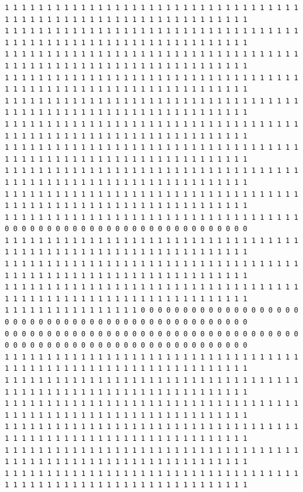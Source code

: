 \documentclass [10 pt, a4 paper]{report}
\begin{document}
\begin{lstlisting}[caption=Output of the simulation once it is finished, label={lst:code1}, frame=single]
1 1 1 1 1 1 1 1 1 1 1 1 1 1 1 1 1 1 1 1 1 1 1 1 1 1 1 1 1 1 1 1 1 1 1 1 1 1 1 1 1 1 1 1 1 1 1 1 1 1 1 1 1 1 1 1 1 1 1 1 1 1 1 1
1 1 1 1 1 1 1 1 1 1 1 1 1 1 1 1 1 1 1 1 1 1 1 1 1 1 1 1 1 1 1 1 1 1 1 1 1 1 1 1 1 1 1 1 1 1 1 1 1 1 1 1 1 1 1 1 1 1 1 1 1 1 1 1
1 1 1 1 1 1 1 1 1 1 1 1 1 1 1 1 1 1 1 1 1 1 1 1 1 1 1 1 1 1 1 1 1 1 1 1 1 1 1 1 1 1 1 1 1 1 1 1 1 1 1 1 1 1 1 1 1 1 1 1 1 1 1 1
1 1 1 1 1 1 1 1 1 1 1 1 1 1 1 1 1 1 1 1 1 1 1 1 1 1 1 1 1 1 1 1 1 1 1 1 1 1 1 1 1 1 1 1 1 1 1 1 1 1 1 1 1 1 1 1 1 1 1 1 1 1 1 1
1 1 1 1 1 1 1 1 1 1 1 1 1 1 1 1 1 1 1 1 1 1 1 1 1 1 1 1 1 1 1 1 1 1 1 1 1 1 1 1 1 1 1 1 1 1 1 1 1 1 1 1 1 1 1 1 1 1 1 1 1 1 1 1
1 1 1 1 1 1 1 1 1 1 1 1 1 1 1 1 1 1 1 1 1 1 1 1 1 1 1 1 1 1 1 1 1 1 1 1 1 1 1 1 1 1 1 1 1 1 1 1 1 1 1 1 1 1 1 1 1 1 1 1 1 1 1 1
1 1 1 1 1 1 1 1 1 1 1 1 1 1 1 1 1 1 1 1 1 1 1 1 1 1 1 1 1 1 1 1 1 1 1 1 1 1 1 1 1 1 1 1 1 1 1 1 1 1 1 1 1 1 1 1 1 1 1 1 1 1 1 1
1 1 1 1 1 1 1 1 1 1 1 1 1 1 1 1 1 1 1 1 1 1 1 1 1 1 1 1 1 1 1 1 1 1 1 1 1 1 1 1 1 1 1 1 1 1 1 1 1 1 1 1 1 1 1 1 1 1 1 1 1 1 1 1
1 1 1 1 1 1 1 1 1 1 1 1 1 1 1 1 1 1 1 1 1 1 1 1 1 1 1 1 1 1 1 1 1 1 1 1 1 1 1 1 1 1 1 1 1 1 1 1 1 1 1 1 1 1 1 1 1 1 1 1 1 1 1 1
1 1 1 1 1 1 1 1 1 1 1 1 1 1 1 1 1 1 1 1 1 1 1 1 1 1 1 1 1 1 1 1 1 1 1 0 0 0 0 0 0 0 0 0 0 0 0 0 0 0 0 0 0 0 0 0 0 0 0 0 0 0 0 0
1 1 1 1 1 1 1 1 1 1 1 1 1 1 1 1 1 1 1 1 1 1 1 1 1 1 1 1 1 1 1 1 1 1 1 1 1 1 1 1 1 1 1 1 1 1 1 1 1 1 1 1 1 1 1 1 1 1 1 1 1 1 1 1
1 1 1 1 1 1 1 1 1 1 1 1 1 1 1 1 1 1 1 1 1 1 1 1 1 1 1 1 1 1 1 1 1 1 1 1 1 1 1 1 1 1 1 1 1 1 1 1 1 1 1 1 1 1 1 1 1 1 1 1 1 1 1 1
1 1 1 1 1 1 1 1 1 1 1 1 1 1 1 1 1 1 1 1 1 1 1 1 1 1 1 1 1 1 1 1 1 1 1 1 1 1 1 1 1 1 1 1 1 1 1 1 1 1 1 1 1 1 1 1 1 1 1 1 1 1 1 1
1 1 1 1 1 1 1 1 1 1 1 1 1 1 1 1 0 0 0 0 0 0 0 0 0 0 0 0 0 0 0 0 0 0 0 0 0 0 0 0 0 0 0 0 0 0 0 0 0 0 0 0 0 0 0 0 0 0 0 0 0 0 0 0
0 0 0 0 0 0 0 0 0 0 0 0 0 0 0 0 0 0 0 0 0 0 0 0 0 0 0 0 0 0 0 0 0 0 0 0 0 0 0 0 0 0 0 0 0 0 0 0 0 0 0 0 0 0 0 0 0 0 0 0 0 0 0 0
1 1 1 1 1 1 1 1 1 1 1 1 1 1 1 1 1 1 1 1 1 1 1 1 1 1 1 1 1 1 1 1 1 1 1 1 1 1 1 1 1 1 1 1 1 1 1 1 1 1 1 1 1 1 1 1 1 1 1 1 1 1 1 1
1 1 1 1 1 1 1 1 1 1 1 1 1 1 1 1 1 1 1 1 1 1 1 1 1 1 1 1 1 1 1 1 1 1 1 1 1 1 1 1 1 1 1 1 1 1 1 1 1 1 1 1 1 1 1 1 1 1 1 1 1 1 1 1
1 1 1 1 1 1 1 1 1 1 1 1 1 1 1 1 1 1 1 1 1 1 1 1 1 1 1 1 1 1 1 1 1 1 1 1 1 1 1 1 1 1 1 1 1 1 1 1 1 1 1 1 1 1 1 1 1 1 1 1 1 1 1 1
1 1 1 1 1 1 1 1 1 1 1 1 1 1 1 1 1 1 1 1 1 1 1 1 1 1 1 1 1 1 1 1 1 1 1 1 1 1 1 1 1 1 1 1 1 1 1 1 1 1 1 1 1 1 1 1 1 1 1 1 1 1 1 1
1 1 1 1 1 1 1 1 1 1 1 1 1 1 1 1 1 1 1 1 1 1 1 1 1 1 1 1 1 1 1 1 1 1 1 1 1 1 1 1 1 1 1 1 1 1 1 1 1 1 1 1 1 1 1 1 1 1 1 1 1 1 1 1
1 1 1 1 1 1 1 1 1 1 1 1 1 1 1 1 1 1 1 1 1 1 1 1 1 1 1 1 1 1 1 1 1 1 1 1 1 1 1 1 1 1 1 1 1 1 1 1 1 1 1 1 1 1 1 1 1 1 1 1 1 1 1 1

\end{lstlisting}
\end{document}
